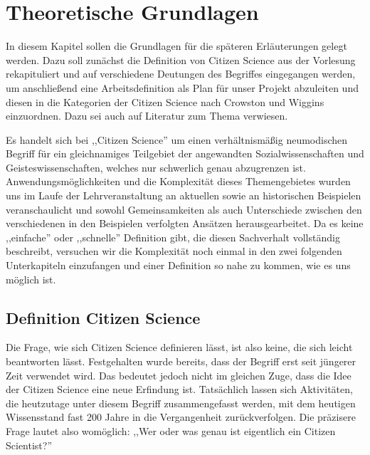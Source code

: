 \documentclass{article}
\begin{document}
\section{Theoretische Grundlagen}
In diesem Kapitel sollen die Grundlagen für die späteren Erläuterungen gelegt werden.
Dazu soll zunächst die Definition von Citizen Science aus der Vorlesung rekapituliert und auf verschiedene Deutungen des Begriffes eingegangen werden,
um anschließend eine Arbeitsdefinition als Plan für unser Projekt abzuleiten und diesen in die Kategorien der Citizen Science nach Crowston und Wiggins einzuordnen.
Dazu sei auch auf Literatur zum Thema verwiesen.

Es handelt sich bei ,,Citizen Science'' um einen verhältnismäßig neumodischen Begriff
für ein gleichnamiges Teilgebiet der angewandten Sozialwissenschaften und Geisteswissenschaften,
welches nur schwerlich genau abzugrenzen ist. Anwendungsmöglichkeiten und die Komplexität dieses Themengebietes
wurden uns im Laufe der Lehrveranstaltung an aktuellen sowie an historischen Beispielen veranschaulicht
und sowohl Gemeinsamkeiten als auch Unterschiede zwischen den verschiedenen in den Beispielen verfolgten Ansätzen herausgearbeitet.
Da es keine ,,einfache'' oder ,,schnelle'' Definition gibt, die diesen Sachverhalt vollständig beschreibt,
versuchen wir die Komplexität noch einmal in den zwei folgenden Unterkapiteln einzufangen
und einer Definition so nahe zu kommen, wie es uns möglich ist.

\subsection{Definition Citizen Science}
Die Frage, wie sich Citizen Science definieren lässt, ist also keine, die sich leicht beantworten lässt.
Festgehalten wurde bereits, dass der Begriff erst seit jüngerer Zeit verwendet wird.
Das bedeutet jedoch nicht im gleichen Zuge, dass die Idee der Citizen Science eine neue Erfindung ist.
Tatsächlich lassen sich Aktivitäten, die heutzutage unter diesem Begriff zusammengefasst werden,
mit dem heutigen Wissensstand fast 200 Jahre in die Vergangenheit zurückverfolgen. Die präzisere Frage lautet also womöglich:
,,Wer oder was genau ist eigentlich ein Citizen Scientist?''
\end{document}
